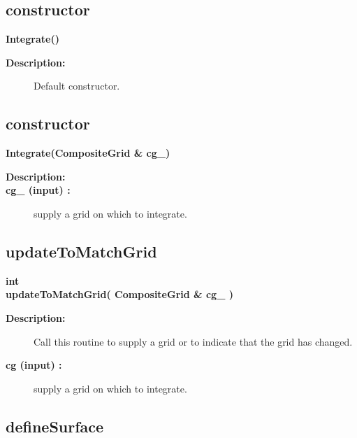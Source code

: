 \subsection{constructor}
 
\newlength{\IntegrateIncludeArgIndent}
\begin{flushleft} \textbf{%
\settowidth{\IntegrateIncludeArgIndent}{Integrate(}%
Integrate()
}\end{flushleft}
\begin{description}
\item[{\bf Description:}] 
   Default constructor.
\end{description}
\subsection{constructor}
 
\begin{flushleft} \textbf{%
\settowidth{\IntegrateIncludeArgIndent}{Integrate(}%
Integrate(CompositeGrid \& cg\_)
}\end{flushleft}
\begin{description}
\item[{\bf Description:}] 
\item[{\bf cg\_ (input) :}]  supply a grid on which to integrate.
\end{description}
\subsection{updateToMatchGrid}
 
\begin{flushleft} \textbf{%
int  \\ 
\settowidth{\IntegrateIncludeArgIndent}{updateToMatchGrid(}%
updateToMatchGrid( CompositeGrid \& cg\_ )
}\end{flushleft}
\begin{description}
\item[{\bf Description:}] 
    Call this routine to supply a grid or to indicate that the grid has changed.
\item[{\bf cg (input) :}]  supply a grid on which to integrate.
\end{description}
\subsection{defineSurface}
 
